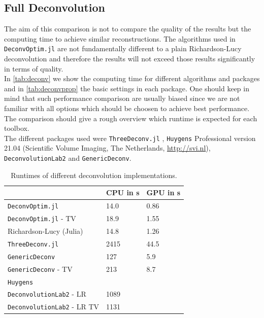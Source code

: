 \documentclass{juliacon}
\begin{document}
    \subsection{Full Deconvolution}
        The aim of this comparison is not to compare the quality of the results but the computing time to achieve similar reconstructions. The algorithms used in \verb|DeconvOptim.jl| are not fundamentally different to a plain Richardson-Lucy deconvolution and therefore the results will 
        not exceed those results significantly in terms of quality.\\
        In \autoref{tab:deconv} we show the computing time for different algorithms and packages and in \autoref{tab:deconvprop} the basic settings
        in each package.
        One should keep in mind that such performance comparison are usually biased since we are not
        familiar with all options which should be choosen to achieve best performance.
        The comparison should give a rough overview which runtime is expected for each toolbox.\\
        The different packages used were \verb|ThreeDeconv.jl| \cite{ikoma2018convex}, \verb|Huygens| Professional version 21.04 (Scientific Volume Imaging, The Netherlands, \url{http://svi.nl}), \verb|DeconvolutionLab2| \cite{deconvlab2} and \verb|GenericDeconv|.  

        \begin{table}[h]
            \begin{tabular}{l l l}
                &  CPU in s& GPU in s\\ 
            \hline
            \verb|DeconvOptim.jl| & 14.0 & 0.86\\
            \verb|DeconvOptim.jl| - TV & 18.9 & 1.55 \\
            Richardson-Lucy (Julia) & 14.8 & 1.26 \\
            \verb|ThreeDeconv.jl|& 2415 & 44.5 \\
            \verb|GenericDeconv|  & 127 & 5.9\\
            \verb|GenericDeconv| - TV & 213 & 8.7 \\
            \verb|Huygens|  & & \\
            \verb|DeconvolutionLab2| - LR & 1089 & \\
            \verb|DeconvolutionLab2| - LR TV& 1131 & 
            \end{tabular}
            \caption{Runtimes of different deconvolution implementations.}
            \label{tab:deconv}
        \end{table}
\end{document}
